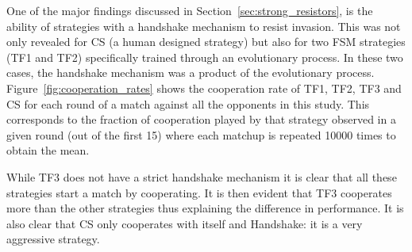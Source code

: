 \documentclass[10pt,journal]{IEEEtran}
\begin{document}
One of the major findings discussed in Section~\ref{sec:strong_resistors}, is
the ability of strategies with a handshake mechanism to resist invasion. This
was not only revealed for CS (a human designed strategy) but also for
two FSM strategies (TF1 and TF2) specifically trained through an evolutionary
process. In these two cases, the handshake mechanism was a product of the
evolutionary process. Figure~\ref{fig:cooperation_rates} shows the cooperation
rate of TF1, TF2, TF3 and CS
for each round of a match against all the opponents in this study. 
This corresponds to the fraction of cooperation played by that strategy observed
in a given round (out of the first 15) where each matchup is repeated 10000 times to
obtain the mean.

While TF3
does not have a strict handshake mechanism it is clear that all these strategies
start a match by cooperating. It is then evident that TF3 cooperates more than
the other strategies thus explaining the difference in performance. It is also
clear that CS only cooperates with itself and Handshake: it is a very aggressive
strategy.
\end{document}
